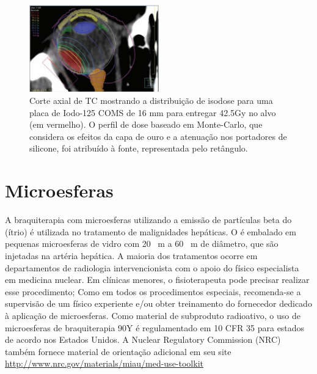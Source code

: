 \documentclass[11pt,a4paper]{article}
\begin{document}
    \begin{figure}[h]
        \centering
        \includegraphics[width=0.5\textwidth]{Imagens/distribDosePlacaComsI125.JPG}
        \caption{Corte axial de TC mostrando a distribuição de isodose para uma placa de Iodo-125 COMS de 16 mm para entregar 42.5Gy no alvo (em vermelho). O perfil de dose baseado em Monte-Carlo, que considera os efeitos da capa de ouro e a atenuação nos portadores de silicone, foi atribuído à fonte, representada pelo retângulo.}
    \end{figure}


\section{Microesferas}

    A braquiterapia com microesferas utilizando a emissão de partículas beta do  (ítrio) é utilizada no tratamento de malignidades hepáticas. O  é embalado em pequenas microesferas de vidro com 20 \unit{\mu m} a 60 \unit{\mu m} de diâmetro, que são injetadas na artéria hepática. A maioria dos tratamentos ocorre em departamentos de radiologia intervencionista com o apoio do físico especialista em medicina nuclear. Em clínicas menores, o fisioterapeuta pode precisar realizar esse procedimento; Como em todos os procedimentos especiais, recomenda-se a supervisão de um físico experiente e/ou obter treinamento do fornecedor dedicado à aplicação de microesferas. Como material de subproduto radioativo, o uso de microesferas de braquiterapia 90Y é regulamentado em 10 CFR 35 para estados de acordo nos Estados Unidos. A Nuclear Regulatory Commission (NRC) também fornece material de orientação adicional em seu site \href{http://www.nrc.gov/materials/miau/med-use-toolkit.html#other}{http://www.nrc.gov/materials/miau/med-use-toolkit}
\end{document}
